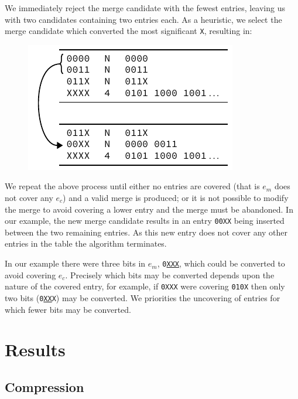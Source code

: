 \documentclass[conference]{IEEEtran}
\newcommand{\mytt}[1]{\texttt{\footnotesize#1}}
\begin{document}
  We immediately reject the merge candidate with the fewest entries, leaving us with two candidates containing two entries each.
  As a heuristic, we select the merge candidate which converted the most significant \mytt{X}, resulting in:\par\nopagebreak
  \begin{figure}[H]
    \centering
    \includegraphics{figures/downcheck_resolve_example_2}
  \end{figure}
  
  We repeat the above process until either no entries are covered (that is $e_m$ does not cover any $e_c$) and a valid merge is produced; or it is not possible to modify the merge to avoid covering a lower entry and the merge must be abandoned.
  In our example, the new merge candidate results in an entry \mytt{00XX} being inserted between the two remaining entries.
  As this new entry does not cover any other entries in the table the algorithm terminates.
  
  In our example there were three bits in $e_m$, \mytt{0\underline{XXX}}, which could be converted to avoid covering $e_c$.
  Precisely which bits may be converted depends upon the nature of the covered entry, for example, if \mytt{0XXX} were covering \mytt{010X} then only two bits (\mytt{0\underline{XX}X}) may be converted.
  We priorities the uncovering of entries for which fewer bits may be converted.

  \section{Results}

  \subsection{Compression}
\end{document}
